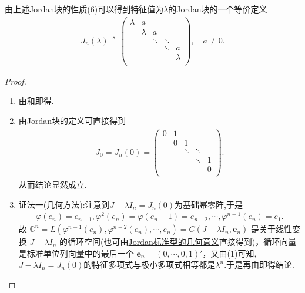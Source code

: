 \documentclass[../../main.tex]{subfiles}
\begin{document}
\begin{note}
由上述Jordan块的性质(6)可以得到特征值为$\lambda$的Jordan块的一个等价定义
\begin{align*}
J_n\left( \lambda \right) \triangleq \left( \begin{matrix}
\lambda&		a&		&		&		\\
&		\lambda&		a&		&		\\
&		&		\ddots&		\ddots&		\\
&		&		&		\ddots&		a\\
&		&		&		&		\lambda\\
\end{matrix} \right) ,\quad a\ne 0.
\end{align*}
\end{note}
\begin{proof}
\begin{enumerate}[(1)]
\item 由和即得.

\item 由Jordan块的定义可直接得到
\begin{align*}
J_0=J_n(0)=\left( \begin{matrix}
0&		1&		&		&		\\
&		0&		1&		&		\\
&		&		\ddots&		\ddots&		\\
&		&		&		\ddots&		1\\
&		&		&		&		0\\
\end{matrix} \right) .
\end{align*}
从而结论显然成立.

\item {\color{blue}证法一(几何方法):}注意到$J-\lambda I_n=J_n(0)$为基础幂零阵,于是
\begin{align*}
\varphi(e_n)=e_{n-1},\varphi^2(e_n)=\varphi(e_n-1)=e_{n-2},\cdots,\varphi^{n-1}(e_n)=e_1.
\end{align*}
故
$\mathbb{C}^n =L(\varphi^{n-1}(e_n),\varphi^{n-2}(e_n),\cdots,e_n)=C(J - \lambda I_n, \boldsymbol{e}_n)$ 是关于线性变换 $J - \lambda I_n$ 的循环空间(也可由\hyperref[theorem:Jordan标准型的几何意义]{Jordan标准型的几何意义}直接得到)，循环向量是标准单位列向量中的最后一个 $\boldsymbol{e}_n = (0, \cdots, 0, 1)'$，又由(1)可知,$J-\lambda I_n=J_n(0)$的特征多项式与极小多项式相等都是$\lambda^n$.于是再由即得结论.


\end{enumerate}
\end{proof}
\end{document}
